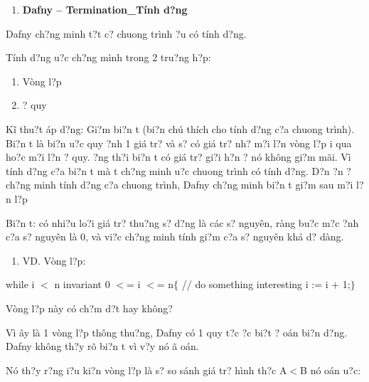 \documentclass{article} %
\begin{document}
\noindent 

\begin{enumerate}
\item  \textbf{Dafny -- Termination\_T\'{i}nh d?ng}
\end{enumerate}

\noindent Dafny ch?ng minh t?t c? chuong tr\`{i}nh {\dj}?u c\'{o} t\'{i}nh d?ng.

\noindent T\'{i}nh d?ng {\dj}u?c ch?ng m\`{i}nh trong 2 tru?ng h?p:

\begin{enumerate}
\item  V\`{o}ng l?p

\item  {\DJ}? quy
\end{enumerate}

K\~{i} thu?t \'{a}p d?ng: Gi?m bi?n t (bi?n ch\'{u} th\'{i}ch cho t\'{i}nh d?ng c?a chuong tr\`{i}nh). Bi?n t l\`{a} bi?n {\dj}u?c quy {\dj}?nh 1 gi\'{a} tr? v\`{a} s? c\'{o} gi\'{a} tr? nh? m?i l?n v\`{o}ng l?p {\dj}i qua ho?c m?i l?n {\dj}? quy. {\DJ}?ng th?i  bi?n t c\'{o} gi\'{a} tr? gi?i h?n {\dj}? n\'{o} kh\^{o}ng gi?m m\~{a}i. V\`{i} t\'{i}nh d?ng c?a bi?n t m\`{a} t ch?ng minh {\dj}u?c chuong tr\`{i}nh c\'{o} t\'{i}nh d?ng. D?n {\dj}?n {\dj}? ch?ng minh t\'{i}nh d?ng c?a chuong tr\`{i}nh, Dafny ch?ng minh bi?n t gi?m sau m?i l?n l?p

Bi?n t: c\'{o} nhi?u lo?i gi\'{a} tr? thu?ng s? d?ng l\`{a} c\'{a}c s? nguy\^{e}n, r\`{a}ng bu?c m?c {\dj}?nh c?a s? nguy\^{e}n l\`{a} 0, v\`{a} vi?c ch?ng minh t\'{i}nh gi?m c?a s? nguy\^{e}n kh\'{a} d? d\`{a}ng.

\begin{enumerate}
\item  VD. V\`{o}ng l?p: 
\end{enumerate}

\noindent while i $<$ n   invariant 0 $<$= i $<$= n$\{$   // do something interesting   i := i + 1;$\}$\textbf{}

\noindent V\`{o}ng l?p n\`{a}y c\'{o} ch?m d?t hay kh\^{o}ng?

\noindent V\`{i} {\dj}\^{a}y l\`{a} 1 v\`{o}ng l?p th\^{o}ng thu?ng, Dafny c\'{o} 1 quy t?c {\dj}?c bi?t {\dj}? {\dj}o\'{a}n bi?n d?ng. Dafny kh\^{o}ng th?y r\~{o} bi?n t v\`{i} v?y n\'{o} {\dj}\~{a} {\dj}o\'{a}n. 

\noindent N\'{o} th?y r?ng {\dj}i?u ki?n v\`{o}ng l?p l\`{a} s? so s\'{a}nh gi\'{a} tr? h\`{i}nh th?c A$<$B n\'{o} {\dj}o\'{a}n {\dj}u?c:
\end{document}
